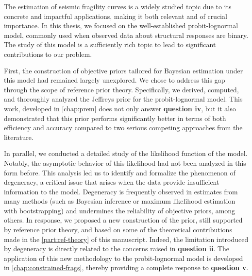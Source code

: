 The estimation of seismic fragility curves is a widely studied topic due to its concrete and impactful applications, making it both relevant and of crucial importance.
In this thesis, we focused on the well-established probit-lognormal model, commonly used when observed data about structural responses are binary. The study of this model %
is a sufficiently rich topic to lead to significant contributions to our problem.


First, the construction of objective priors tailored
for Bayesian estimation under this model had remained largely unexplored. We chose to address this gap through the scope of reference prior theory. Specifically, we derived, computed, and thoroughly analyzed the Jeffreys prior for the probit-lognormal model. This work, developed in \cref{chap:prem} does not only answer \textbf{question iv}, but it also demonstrated that this prior performs significantly better in terms of both efficiency and accuracy compared to two serious competing approaches from the literature.

In parallel, we conducted a detailed study of the likelihood function of the model. Notably, the asymptotic behavior of this likelihood had not been analyzed in this form before. This analysis led us to identify and formalize the phenomenon of degeneracy, a critical issue that arises when the data provide insufficient information to  the model. 
Degeneracy is frequently observed in estimates from many methods (such as Bayesian inference or maximum likelihood estimation with bootstrapping) and
undermines the reliability of objective priors, among others. In response, we proposed a new construction of the prior, still supported by reference prior theory, and based on some of the theoretical contributions made in the \cref{part:ref-theory} of this manuscript. Indeed, the limitation introduced by degeneracy is directly related to the concerns raised in \textbf{question ii}. The application of this new methodology to the probit-lognormal model is developed in \cref{chap:constrained-frags}, thereby providing a complete response to \textbf{question v}.

